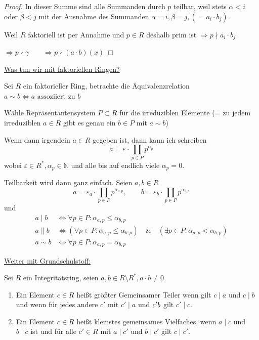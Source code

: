 \documentclass[12pt,parskip=full]{scrartcl}
\newcommand{\setN}{\mathbb{N}}
\newcommand{\heading}{\underline}
\theoremstyle{definition}
\theoremstyle{remark}
\begin{document}
\begin{proof}
		In dieser Summe sind alle Summanden durch $p$ teilbar, weil stets $\alpha < i$ oder $\beta < j$ mit der Ausnahme des Summanden $\alpha = i, \beta = j, (= a_i \cdot b_j)$.
		
		Weil $R$ faktoriell ist per Annahme und $p \in R$ deshalb prim ist $\Rightarrow p \nmid a_i \cdot b_j$
		
		$\Rightarrow p \nmid \gamma \qquad \Rightarrow p \nmid (a \cdot b)(x)$
	\end{proof}

	\heading{Was tun wir mit faktoriellen Ringen?}
	
	Sei $R$ ein faktorieller Ring, betrachte die Äquivalenzrelation $a \sim b \Leftrightarrow a \text{ assoziiert zu } b$
	
	Wähle Repräsentantensystem $P \subset R$ für die irreduziblen Elemente (= zu jedem irreduziblen $a \in R$ gibt es genau ein $b \in P$ mit $a \sim b$)
	
	Wenn dann irgendein $a \in R$ gegeben ist, dann kann ich schreiben
	\begin{equation*}
		a = \varepsilon \cdot \prod_{p \in P} p^{\alpha_p}
	\end{equation*}
	wobei $\varepsilon \in R^*, \alpha_p \in \setN$ und alle bis auf endlich viele $\alpha_p = 0$.
	
	Teilbarkeit wird dann ganz einfach. Seien $a, b \in R$
	\begin{equation*}
		a = \varepsilon_a \cdot \prod_{p \in P} p^{\alpha_{a,p}}, \qquad b = \varepsilon_b \cdot \prod_{p \in P} p^{\alpha_{b,p}}
	\end{equation*}
	und
	\begin{align*}
		a \mid b &\Leftrightarrow \forall p \in P: \alpha_{a,p} \leq \alpha_{b,p} \\
		a \parallel b &\Leftrightarrow (\forall p \in P: \alpha_{a,p} \leq \alpha_{b,p}) \quad\&\quad (\exists p \in P: \alpha_{a,p} < \alpha_{b,p})\\
		a \sim b &\Leftrightarrow \forall p \in P: \alpha_{a,p} = \alpha_{b,p}
	\end{align*}
	
	\heading{Weiter mit Grundschulstoff:}
	
	Sei $R$ ein Integritätsring, seien $a,b \in R \setminus R^*, a \cdot b \neq 0$
	
	\begin{enumerate}
		\item Ein Element $c \in R$ heißt größter Gemeinsamer Teiler wenn gilt $c \mid a$ und $c \mid b$ und wenn für jedes andere $c'$ mit $c' \mid a$ und $c' \mit b$ gilt $c' \mid c$.
		\item Ein Element $c \in R$ heißt kleinstes gemeinsames Vielfaches, wenn $a \mid c$ und $b \mid c$ ist und für alle $c' \in R$ mit $a \mid c'$ und $b \mid c'$ gilt $c \mid c'$.
	\end{enumerate}
\end{document}
